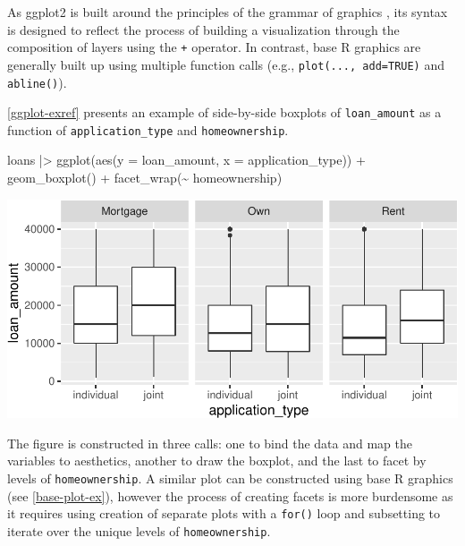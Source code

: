 \documentclass[12pt]{article}
\newenvironment{Shaded}{\begin{snugshade}}{\end{snugshade}}
\newcommand{\AttributeTok}[1]{\textcolor[rgb]{0.77,0.63,0.00}{#1}}
\newcommand{\FunctionTok}[1]{\textcolor[rgb]{0.00,0.00,0.00}{#1}}
\newcommand{\NormalTok}[1]{#1}
\newcommand{\SpecialCharTok}[1]{\textcolor[rgb]{0.00,0.00,0.00}{#1}}
\begin{document}
As ggplot2 is built around the principles of the grammar of graphics
\citep{wilkinson2012grammar}, its syntax is designed to reflect the
process of building a visualization through the composition of layers
using the \texttt{+} operator. In contrast, base R graphics are
generally built up using multiple function calls (e.g.,
\texttt{plot(...,\ add=TRUE)} and \texttt{abline()}).

\ref{ggplot-exref} presents an example of side-by-side boxplots of
\texttt{loan\_amount} as a function of \texttt{application\_type} and
\texttt{homeownership}.

\linespread{1}

\begin{Shaded}
\begin{Highlighting}[]
\NormalTok{loans }\SpecialCharTok{|\textgreater{}}
  \FunctionTok{ggplot}\NormalTok{(}\FunctionTok{aes}\NormalTok{(}\AttributeTok{y =}\NormalTok{ loan\_amount, }\AttributeTok{x =}\NormalTok{ application\_type)) }\SpecialCharTok{+}
  \FunctionTok{geom\_boxplot}\NormalTok{() }\SpecialCharTok{+}
  \FunctionTok{facet\_wrap}\NormalTok{(}\SpecialCharTok{\textasciitilde{}}\NormalTok{ homeownership)}
\end{Highlighting}
\end{Shaded}

\begin{center}\includegraphics[width=0.8\linewidth]{educators-perspective-tidyverse_files/figure-latex/ggplot_ex-1} \end{center}

\label{ggplot-exref} \linespread{2}
\vspace{3mm}\setlength{\parindent}{15pt}

The figure is constructed in three calls: one to bind the data and map
the variables to aesthetics, another to draw the boxplot, and the last
to facet by levels of \texttt{homeownership}. A similar plot can be
constructed using base R graphics (see \ref{base-plot-ex}), however the
process of creating facets is more burdensome as it requires using
creation of separate plots with a \texttt{for()} loop and subsetting to
iterate over the unique levels of \texttt{homeownership}.
\end{document}
